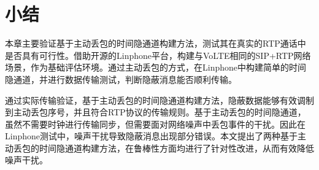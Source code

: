 \section{小结}
\label{chap:linphone:conclude}

本章主要验证基于主动丢包的时间隐通道构建方法，测试其在真实的RTP通话中是否具有可行性。借助开源的Linphone平台，构建与VoLTE相同的SIP+RTP网络场景，作为基础评估环境。通过主动丢包的方式，在Linphone中构建简单的时间隐通道，并进行数据传输测试，判断隐蔽消息能否顺利传输。

通过实际传输验证，基于主动丢包的时间隐通道构建方法，隐蔽数据能够有效调制到主动丢包序号，并且符合RTP协议的传输规则。基于主动丢包的时间隐通道，虽然不需要时钟进行传输同步，但需要面对网络噪声中丢包事件的干扰。因此在Linphone测试中，噪声干扰导致隐蔽消息出现部分错误。本文提出了两种基于主动丢包的时间隐通道构建方法，在鲁棒性方面均进行了针对性改进，从而有效降低噪声干扰。